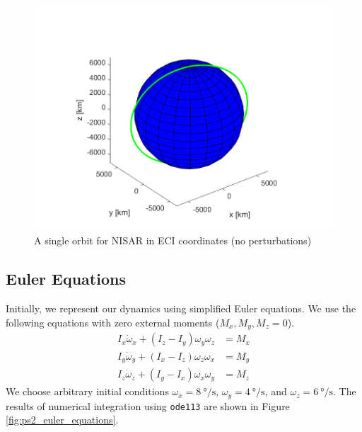 \begin{figure}[H]
\centering
\includegraphics[scale=0.7]{Images/ps2_problem1.png}
\caption{A single orbit for NISAR in ECI coordinates (no perturbations)}
\label{fig:simple_propagator}
\end{figure}

\subsection{Euler Equations}
Initially, we represent our dynamics using simplified Euler equations. We use the following equations with zero external moments ($M_{x}, M_{y}, M_{z} = 0$).
\begin{align*}
    I_{x} \Dot{\omega}_{x} + (I_{z} - I_{y}) \omega_{y} \omega_{z} &= M_{x} \\
    I_{y} \Dot{\omega}_{y} + (I_{x} - I_{z}) \omega_{z} \omega_{x} &= M_{y} \\
    I_{z} \Dot{\omega}_{z} + (I_{y} - I_{x}) \omega_{x} \omega_{y} &= M_{z}
\end{align*}
We choose arbitrary initial conditions $\omega_{x} = \qty{8}{\degree\per\second}$, $\omega_{y} = \qty{4}{\degree\per\second}$, and $\omega_{z} = \qty{6}{\degree\per\second}$. The results of numerical integration using \texttt{ode113} are shown in Figure \ref{fig:ps2_euler_equations}.

